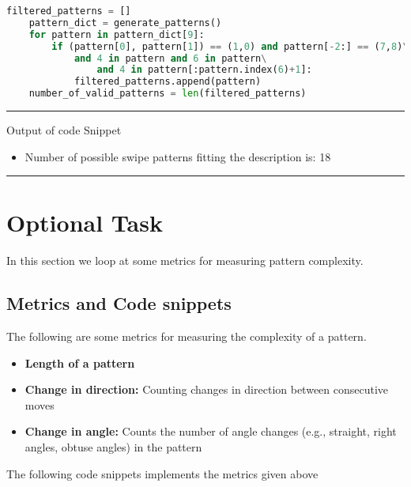 \documentclass[12pt]{article}
\theoremstyle{definition}
\begin{document}
\begin{lstlisting}[language=Python, caption=Exercise 7]
    filtered_patterns = []
    pattern_dict = generate_patterns()
    for pattern in pattern_dict[9]:
        if (pattern[0], pattern[1]) == (1,0) and pattern[-2:] == (7,8)\
            and 4 in pattern and 6 in pattern\
                and 4 in pattern[:pattern.index(6)+1]:
            filtered_patterns.append(pattern)
    number_of_valid_patterns = len(filtered_patterns)
\end{lstlisting}

{\color{red} \rule{\linewidth}{0.5mm}}
Output of code Snippet
\begin{itemize}
    \item Number of possible swipe patterns fitting the description is: 18
\end{itemize}
{\color{red} \rule{\linewidth}{0.5mm}}

\section*{Optional Task}
In this section we loop at some metrics for measuring pattern complexity.

\subsection*{Metrics and Code snippets }
The following are some metrics for measuring the complexity of a pattern.
\begin{itemize}
    \item \textbf{Length of a pattern}
    \item \textbf{Change in direction:} Counting changes in direction between consecutive moves
    \item \textbf{Change in angle:} Counts the number of angle changes (e.g., straight, right angles, obtuse angles) in the pattern
\end{itemize}
The following code snippets implements the metrics given above
\end{document}
